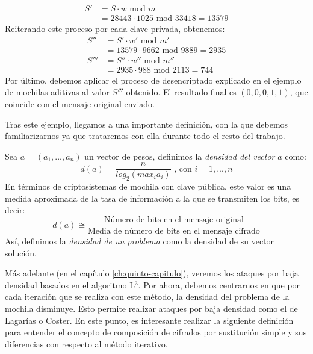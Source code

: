 \begin{ejemplo}
        \begin{align}
            S' &= S \cdot w \text{ mod } m \\
            &= 28443 \cdot 1025 \text{ mod } 33418 = 13579
        \end{align}
        Reiterando este proceso por cada clave privada, obtenemos:
        \begin{align}
            S'' &= S' \cdot w' \text{ mod } m' \\
            &= 13579 \cdot 9662 \text{ mod } 9889 = 2935 \\
            S''' &= S'' \cdot w'' \text{ mod } m'' \\
            &= 2935 \cdot 988 \text{ mod } 2113 = 744
        \end{align}
        Por último, debemos aplicar el proceso de desencriptado explicado en el ejemplo de mochilas aditivas al valor $S'''$ obtenido. El resultado final es $(0, 0, 0, 1, 1)$, que coincide con el mensaje original enviado.
    \end{ejemplo}

    Tras este ejemplo, llegamos a una importante definición, con la que debemos familiarizarnos ya que trataremos con ella durante todo el resto del trabajo.
    
    \begin{definicion} \cite{artLagOdl} \label{def:3.8}
        Sea $a = (a_{1}, ... , a_{n})$ un vector de pesos, definimos la \textit{densidad del vector} $a$ como:
        \begin{equation}
            d(a) = \frac{n}{log_{2}(max_{i} a_{i})} \text{ , con } i = 1, ... , n
        \end{equation}
        En términos de criptosistemas de mochila con clave pública, este valor es una medida aproximada de la tasa de información a la que se transmiten los bits, es decir:
        \begin{equation}
            d(a) \cong \frac{\text{Número de bits en el mensaje original}}{\text{Media de número de bits en el mensaje cifrado}}
        \end{equation}
        Así, definimos la \textit{densidad de un problema} como la densidad de su vector solución.
    \end{definicion}

    Más adelante (en el capítulo \ref{ch:quinto-capitulo}), veremos los ataques por baja densidad basados en el algoritmo L$^{3}$. Por ahora, debemos centrarnos en que por cada iteración que se realiza con este método, la densidad del problema de la mochila disminuye. Esto permite realizar ataques por baja densidad como el de Lagarías o Coster. En este punto, es interesante realizar la siguiente definición para entender el concepto de composición de cifrados por sustitución simple y sus diferencias con respecto al método iterativo.
    
